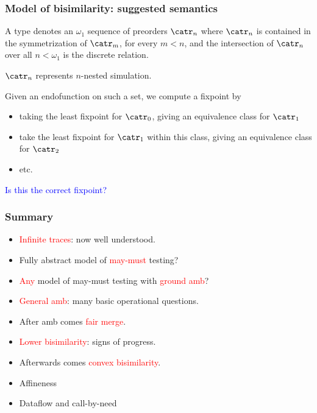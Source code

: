 \documentclass{beamer}
\newcommand{\red}[1]{\textcolor{red}{#1}}
\newcommand{\blue}[1]{\textcolor{blue}{#1}}
\begin{document}
\begin{frame}\frametitle{Model of bisimilarity: suggested semantics}


A type denotes an $\omega_{1}$ sequence of preorders $\catr_{n}$ where $\catr_{n}$ is contained in the symmetrization of $\catr_{m}$, for every $m < n$, and the intersection of $\catr_{n}$ over all $n < \omega_{1}$ is the discrete relation. \\

\medskip

$\catr_{n}$ represents $n$-nested simulation. \\

\medskip

Given an endofunction on such a set, we compute a fixpoint by
\begin{itemize}
\item taking the least fixpoint for $\catr_{0}$, giving an equivalence class for $\catr_{1}$
\item take the least fixpoint for $\catr_{1}$ within this class, giving an equivalence class for $\catr_{2}$
\item etc.
\end{itemize}
\medskip

\blue{Is this the correct fixpoint?}

\end{frame}

\begin{frame}\frametitle{Summary}

  \begin{itemize}
  \item \red{Infinite traces}: now well understood.
  \item Fully abstract model of \red{may-must} testing?
  \item \red{Any} model of may-must testing with \red{ground amb}?
  \item \red{General amb}: many basic operational questions.
 \item After amb comes \red{fair merge}.
\item \red{Lower bisimilarity}: signs of progress.
\item Afterwards comes \red{convex bisimilarity}.
  \item Affineness
  \item Dataflow and call-by-need
  \end{itemize}

\end{frame}
\end{document}
